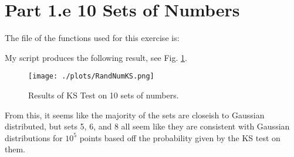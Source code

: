 \section{Part 1.e 10 Sets of Numbers}

The file of the functions used for this exercise is:



My script produces the following result, see Fig. \ref{fig:10_sets}.

\begin{figure}[h!]
  \centering
  \texttt{[image: ./plots/RandNumKS.png]}
  \caption{Results of KS Test on 10 sets of numbers.}
  \label{fig:10_sets}
\end{figure}

From this, it seems like the majority of the sets are closeish to Gaussian distributed, but sets 5, 6, and 8 all seem like
they are consistent with Gaussian distributions for $10^5$ points based off the probability given by the KS test on them.

